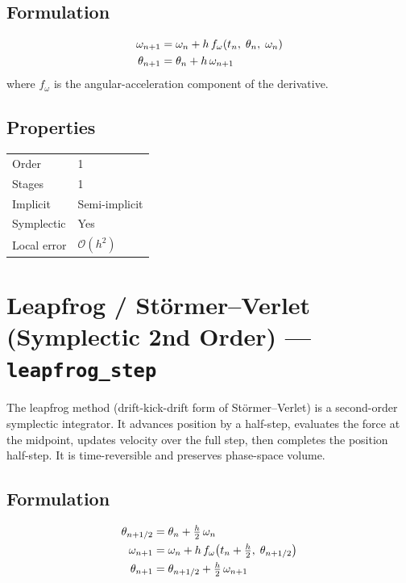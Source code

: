 \documentclass[11pt,a4paper]{article}
\newcommand{\bigO}{\mathcal{O}}
\begin{document}
\subsection{Formulation}
\begin{align}
  \omega_{n+1} &= \omega_n + h\,f_\omega(t_n,\;\theta_n,\;\omega_n) \notag\\
  \theta_{n+1} &= \theta_n + h\,\omega_{n+1}
  \label{eq:sie}
\end{align}
where $f_\omega$ is the angular-acceleration component of the derivative.

\subsection{Properties}
\begin{center}
\begin{tabular}{ll}
  \hline
  Order          & 1 \\
  Stages         & 1 \\
  Implicit       & Semi-implicit \\
  Symplectic     & Yes \\
  Local error    & $\bigO(h^2)$ \\
  \hline
\end{tabular}
\end{center}

\section{Leapfrog / St\"{o}rmer--Verlet (Symplectic 2nd Order) --- \texttt{leapfrog\_step}}
\label{sec:leapfrog}

The leapfrog method (drift-kick-drift form of St\"{o}rmer--Verlet) is a
second-order symplectic integrator. It advances position by a half-step,
evaluates the force at the midpoint, updates velocity over the full step,
then completes the position half-step. It is time-reversible and preserves
phase-space volume.

\subsection{Formulation}
\begin{align}
  \theta_{n+1/2} &= \theta_n + \tfrac{h}{2}\,\omega_n \notag\\
  \omega_{n+1}   &= \omega_n + h\,f_\omega\!\left(t_n + \tfrac{h}{2},\;\theta_{n+1/2}\right) \notag\\
  \theta_{n+1}   &= \theta_{n+1/2} + \tfrac{h}{2}\,\omega_{n+1}
  \label{eq:leapfrog}
\end{align}
\end{document}
